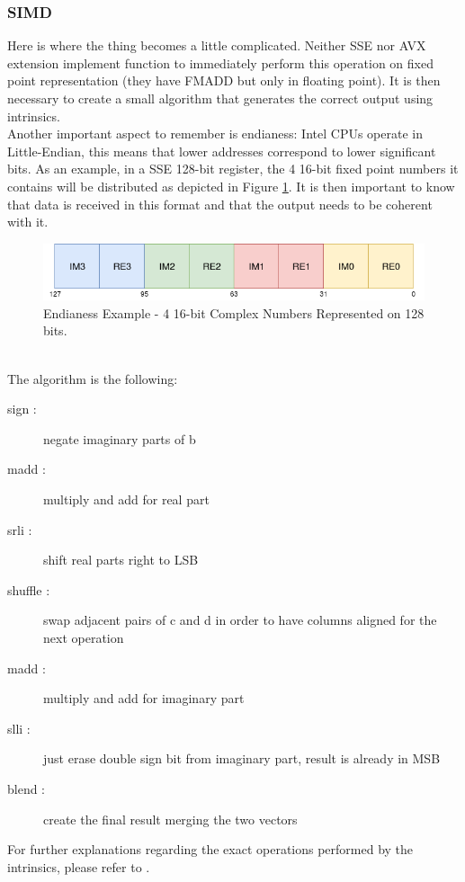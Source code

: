 \documentclass[a4paper]{article}
\begin{document}
\subsubsection{SIMD}
Here is where the thing becomes a little complicated. Neither SSE nor AVX extension implement function to immediately perform this operation on fixed point representation (they have FMADD but only in floating point). It is then necessary to create a small algorithm that generates the correct output using intrinsics.
\\Another important aspect to remember is endianess: Intel CPUs operate in Little-Endian, this means that lower addresses correspond to lower significant bits. As an example, in a SSE 128-bit register, the 4 16-bit fixed point numbers it contains will be distributed as depicted in Figure \ref{fig:endianess}. It is then important to know that data is received in this format and that the output needs to be coherent with it.
\begin{figure}[h]
	\centering
	\includegraphics[width=\linewidth]{endianess.png}
	\caption{Endianess Example - 4 16-bit Complex Numbers Represented on 128 bits.}
	\label{fig:endianess}
\end{figure}
\\The algorithm is the following:
\begin{description}
	\item[sign :]  negate imaginary parts of b
    \item[madd :] multiply and add for real part
    \item[srli :] shift real parts right to LSB
	\item[shuffle :] swap adjacent pairs of c and d in order to have columns aligned for the next operation
	\item[madd :] multiply and add for imaginary part
	\item[slli :] just erase double sign bit from imaginary part, result is already in MSB
	\item[blend :] create the final result merging the two vectors 
\end{description}
For further explanations regarding the exact operations performed by the intrinsics, please refer to \autocite{IIG}. 
\end{document}
